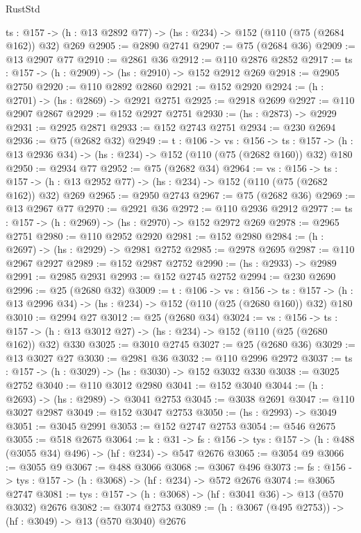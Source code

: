 \begin{lexlean}{RustStd}
\begin{coremodule}
  {ts : @157} -> (h : @13 @2892 @77) -> (hs : @234) -> @152 (@110 (@75 (@2684 @162)) @32) @269
@2905 := @2890 @2741
@2907 := @75 (@2684 @36)
@2909 := @13 @2907 @77
@2910 := @2861 @36
@2912 := @110 @2876 @2852
@2917 := {ts : @157} -> (h : @2909) -> (hs : @2910) -> @152 @2912 @269
@2918 := @2905 @2750
@2920 := @110 @2892 @2860
@2921 := @152 @2920
@2924 := (h : @2701) -> (hs : @2869) -> @2921 @2751
@2925 := @2918 @2699
@2927 := @110 @2907 @2867
@2929 := @152 @2927 @2751
@2930 := (hs : @2873) -> @2929
@2931 := @2925 @2871
@2933 := @152 @2743 @2751
@2934 := @230 @2694
@2936 := @75 (@2682 @32)
@2949 := {t : @106} ->
  {vs : @156} ->
  {ts : @157} -> (h : @13 @2936 @34) -> (hs : @234) -> @152 (@110 (@75 (@2682 @160)) @32) @180
@2950 := @2934 @77
@2952 := @75 (@2682 @34)
@2964 := {vs : @156} ->
  {ts : @157} -> (h : @13 @2952 @77) -> (hs : @234) -> @152 (@110 (@75 (@2682 @162)) @32) @269
@2965 := @2950 @2743
@2967 := @75 (@2682 @36)
@2969 := @13 @2967 @77
@2970 := @2921 @36
@2972 := @110 @2936 @2912
@2977 := {ts : @157} -> (h : @2969) -> (hs : @2970) -> @152 @2972 @269
@2978 := @2965 @2751
@2980 := @110 @2952 @2920
@2981 := @152 @2980
@2984 := (h : @2697) -> (hs : @2929) -> @2981 @2752
@2985 := @2978 @2695
@2987 := @110 @2967 @2927
@2989 := @152 @2987 @2752
@2990 := (hs : @2933) -> @2989
@2991 := @2985 @2931
@2993 := @152 @2745 @2752
@2994 := @230 @2690
@2996 := @25 (@2680 @32)
@3009 := {t : @106} ->
  {vs : @156} ->
  {ts : @157} -> (h : @13 @2996 @34) -> (hs : @234) -> @152 (@110 (@25 (@2680 @160)) @32) @180
@3010 := @2994 @27
@3012 := @25 (@2680 @34)
@3024 := {vs : @156} ->
  {ts : @157} -> (h : @13 @3012 @27) -> (hs : @234) -> @152 (@110 (@25 (@2680 @162)) @32) @330
@3025 := @3010 @2745
@3027 := @25 (@2680 @36)
@3029 := @13 @3027 @27
@3030 := @2981 @36
@3032 := @110 @2996 @2972
@3037 := {ts : @157} -> (h : @3029) -> (hs : @3030) -> @152 @3032 @330
@3038 := @3025 @2752
@3040 := @110 @3012 @2980
@3041 := @152 @3040
@3044 := (h : @2693) -> (hs : @2989) -> @3041 @2753
@3045 := @3038 @2691
@3047 := @110 @3027 @2987
@3049 := @152 @3047 @2753
@3050 := (hs : @2993) -> @3049
@3051 := @3045 @2991
@3053 := @152 @2747 @2753
@3054 := @546 @2675
@3055 := @518 @2675
@3064 := {k : @31} ->
  {fs : @156} -> {tys : @157} -> (h : @488 (@3055 @34) @496) -> (hf : @234) -> @547 @2676
@3065 := @3054 @9
@3066 := @3055 @9
@3067 := @488 @3066
@3068 := @3067 @496
@3073 := {fs : @156} -> {tys : @157} -> (h : @3068) -> (hf : @234) -> @572 @2676
@3074 := @3065 @2747
@3081 := {tys : @157} -> (h : @3068) -> (hf : @3041 @36) -> @13 (@570 @3032) @2676
@3082 := @3074 @2753
@3089 := (h : @3067 (@495 @2753)) -> (hf : @3049) -> @13 (@570 @3040) @2676

\end{coremodule}
\end{lexlean}
